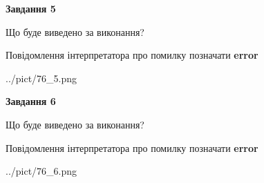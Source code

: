 \documentclass[12pt, ukrainian]{article}
\begin{document}
{{\begin {center}\textbf{Завдання 5}\end {center}}\par
Що буде виведено за виконання? \par
Повідомлення інтерпретатора про помилку позначати \textbf{error}

\begin{center}
	{../pict/76_5.png}
\end{center}
\newpage

{\begin {center}\textbf{Завдання 6}\end {center}}\par
Що буде виведено за виконання? \par
Повідомлення інтерпретатора про помилку позначати \textbf{error}

\begin{center}
	{../pict/76_6.png}
\end{center}
\newpage

}
\end{document}
